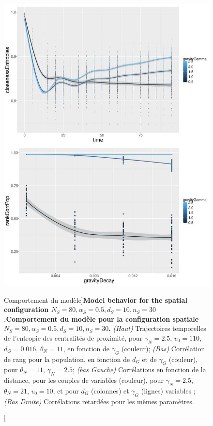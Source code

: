 \begin{figure}
	\includegraphics[width=\linewidth,height=0.85\textheight]{Figures/Final/6-1-3-fig-macrocoevolexplo-behavior.jpg}
	\caption[Model Behavior][Comportement du modèle]{\textbf{Model behavior for the spatial configuration $N_S=80,\alpha_S=0.5,d_S=10,n_S=30$.}\label{fig:macrocoevolexplo:behavior}}{\textbf{Comportement du modèle pour la configuration spatiale $N_S=80,\alpha_S=0.5,d_S=10,n_S=30$.} \textit{(Haut)} Trajectoires temporelles de l'entropie des centralités de proximité, pour $\gamma_N = 2.5$, $v_0 = 110$, $d_G = 0.016$, $\theta_N = 11$, en fonction de $\gamma_G$ (couleur); \textit{(Bas)} Corrélation de rang pour la population, en fonction de $d_G$ et de $\gamma_G$ (couleur), pour $\theta_N = 11$, $\gamma_N = 2.5$; \textit{(bas Gauche)} Corrélations en fonction de la distance, pour les couples de variables (couleur), pour $\gamma_N = 2.5$, $\theta_N = 21$, $v_0 = 10$, et pour $d_G$ (colonnes) et $\gamma_G$ (lignes) variables ; \textit{(Bas Droite)} Corrélations retardées pour les mêmes paramètres.\label{fig:macrocoevolexplo:behavior}}
\end{figure}



